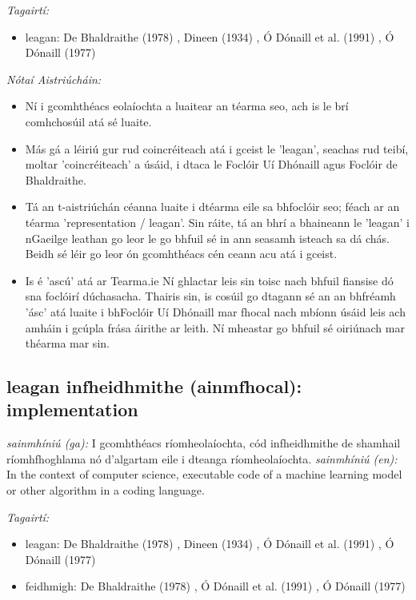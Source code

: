 \documentclass{article}
\begin{document}
 \noindent \textit{Tagairtí:}
\begin{itemize}
	\item leagan: De Bhaldraithe (1978) \cite{de-bhaldraithe}, Dineen (1934) \cite{dineen}, Ó Dónaill et al. (1991) \cite{focloir-beag}, Ó Dónaill (1977) \cite{odonaill}
\end{itemize}

 \noindent \textit{Nótaí Aistriúcháin:}
\begin{itemize}
	\item Ní i gcomhthéacs eolaíochta a luaitear an téarma seo, ach is le brí comhchosúil atá sé luaite.
	\item Más gá a léiriú gur rud coincréiteach atá i gceist le 'leagan', seachas rud teibí, moltar 'coincréiteach' a úsáid, i dtaca le Foclóir Uí Dhónaill agus Foclóir de Bhaldraithe.
	\item Tá an t-aistriúchán céanna luaite i dtéarma eile sa bhfoclóir seo; féach ar an téarma 'representation / leagan'. Sin ráite, tá an bhrí a bhaineann le 'leagan' i nGaeilge leathan go leor le go bhfuil sé in ann seasamh isteach sa dá chás. Beidh sé léir go leor ón gcomhthéacs cén ceann acu atá i gceist.
	\item Is é 'ascú' atá ar Tearma.ie Ní ghlactar leis sin toisc nach bhfuil fiansise dó sna foclóirí dúchasacha. Thairis sin, is cosúil go dtagann sé an an bhfréamh 'ásc' atá luaite i bhFoclóir Uí Dhónaill mar fhocal nach mbíonn úsáid leis ach amháin i gcúpla frása áirithe ar leith. Ní mheastar go bhfuil sé  oiriúnach mar théarma mar sin.
\end{itemize}


\subsection*{leagan infheidhmithe (ainmfhocal): implementation} 
 \noindent \textit{sainmhíniú (ga):} I gcomhthéacs ríomheolaíochta, cód infheidhmithe de shamhail ríomhfhoghlama nó d'algartam eile i dteanga ríomheolaíochta.
\newline\newline
 \noindent \textit{sainmhíniú (en):} In the context of computer science, executable code of a machine learning model or other algorithm in a coding language.
\newline

 \noindent \textit{Tagairtí:}
\begin{itemize}
	\item leagan: De Bhaldraithe (1978) \cite{de-bhaldraithe}, Dineen (1934) \cite{dineen}, Ó Dónaill et al. (1991) \cite{focloir-beag}, Ó Dónaill (1977) \cite{odonaill}
	\item feidhmigh: De Bhaldraithe (1978) \cite{de-bhaldraithe}, Ó Dónaill et al. (1991) \cite{focloir-beag}, Ó Dónaill (1977) \cite{odonaill}
\end{itemize}
\end{document}
